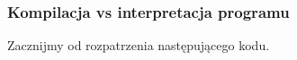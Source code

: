 \documentclass[10pt,t]{beamer}
\begin{document}
\begin{frame}
  \frametitle{Kompilacja vs interpretacja programu}


  Zacznijmy od rozpatrzenia następującego kodu.

\end{frame}

















































\end{document}
